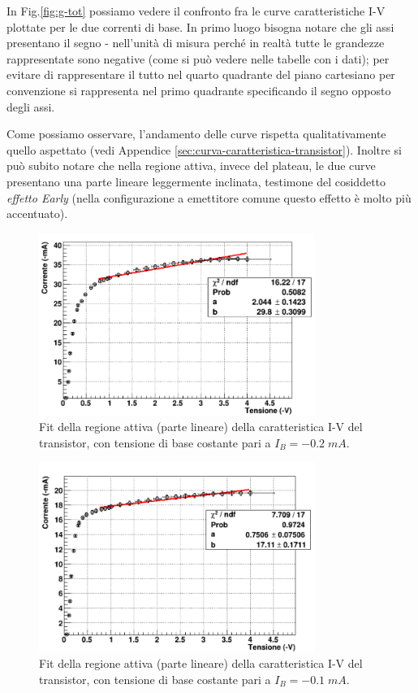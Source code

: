 \documentclass[a4paper, 11pt]{article}
\begin{document}
\newpage
In Fig.\ref{fig:g-tot} possiamo vedere il confronto fra le curve caratteristiche I-V plottate per le due correnti di base. In primo luogo bisogna notare che gli assi presentano il segno - nell'unità di misura perché in realtà tutte le grandezze rappresentate sono negative (come si può vedere nelle tabelle con i dati); per evitare di rappresentare il tutto nel quarto quadrante del piano cartesiano per convenzione si rappresenta nel primo quadrante specificando il segno opposto degli assi. 

Come possiamo osservare, l'andamento delle curve rispetta qualitativamente quello aspettato (vedi Appendice \ref{sec:curva-caratteristica-transistor}). Inoltre si può subito notare che nella regione attiva, invece del plateau, le due curve presentano una parte lineare leggermente inclinata, testimone del cosiddetto \textit{effetto Early} (nella configurazione a emettitore comune questo effetto è molto più accentuato). 

\begin{figure}[!htb]
    \centering
    \includegraphics[width=0.8\textwidth]{Immagini - Seconda prova/Fit-200.png}
    \caption{Fit della regione attiva (parte lineare) della caratteristica I-V del transistor, con tensione di base costante pari a $I_B = -0.2 \;mA $.}
    \label{fig:fit-200}
\end{figure}

\begin{figure}[!htb]
    \centering
    \includegraphics[width=0.8\textwidth]{Immagini - Seconda prova/Fit-100.png}
    \caption{Fit della regione attiva (parte lineare) della caratteristica I-V del transistor, con tensione di base costante pari a $I_B = -0.1 \;mA $.}
    \label{fig:fit-100}
\end{figure}
\end{document}
